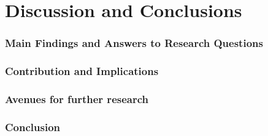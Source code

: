 \chapter{Discussion and Conclusions}
\label{chapter:discussion}


\subsection{Main Findings and Answers to Research Questions}


\subsection{Contribution and Implications}



\subsection{Avenues for further research}

\subsection{Conclusion}
